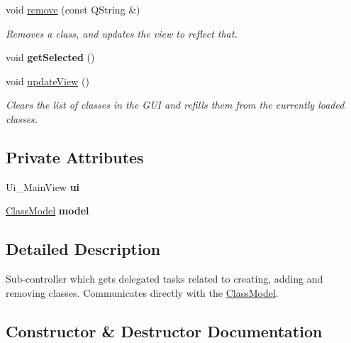 \begin{DoxyCompactItemize}
\item 
void \hyperlink{classClassController_ac8d209c4e52899c11020f6a3b35f6416}{remove} (const Q\+String \&)
\begin{DoxyCompactList}\small\item\em Removes a class, and updates the view to reflect that. \end{DoxyCompactList}\item 
\mbox{\label{classClassController_af2d0c1757a9f67b7097ff6f4e38cd842}} 
void {\bfseries get\+Selected} ()
\item 
\mbox{\label{classClassController_a1a286317364cc2fddb8c5c2419f38134}} 
void \hyperlink{classClassController_a1a286317364cc2fddb8c5c2419f38134}{update\+View} ()
\begin{DoxyCompactList}\small\item\em Clears the list of classes in the G\+UI and refills them from the currently loaded classes. \end{DoxyCompactList}\end{DoxyCompactItemize}
\subsection*{Private Attributes}
\begin{DoxyCompactItemize}
\item 
\mbox{\label{classClassController_a4c59d251037fb7c71597210e655a9f10}} 
Ui\+\_\+\+Main\+View {\bfseries ui}
\item 
\mbox{\label{classClassController_ab14c00b28d3a7a7d6178deaa3a2aa88d}} 
\hyperlink{classClassModel}{Class\+Model} {\bfseries model}
\end{DoxyCompactItemize}


\subsection{Detailed Description}
Sub-\/controller which gets delegated tasks related to creating, adding and removing classes. Communicates directly with the \hyperlink{classClassModel}{Class\+Model}. 

\subsection{Constructor \& Destructor Documentation}
\mbox{\label{classClassController_a6edb502072d6d3c5d7f1905ef4c7a81a}} 
